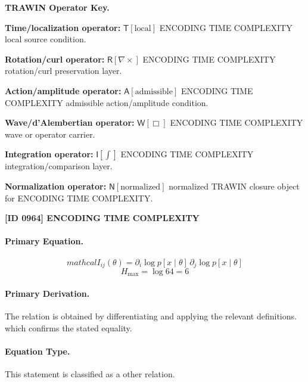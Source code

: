 \par\vspace{0.45\baselineskip}
\noindent\begin{minipage}[t]{\linewidth}
\begingroup
\small
\raggedright
\textbf{TRAWIN Operator Key.}\par
\noindent\textbf{Time/localization operator:} $\mathsf{T}\!\left[\mathrm{local}\right]$ ENCODING TIME COMPLEXITY local source condition.\par
\noindent\textbf{Rotation/curl operator:} $\mathsf{R}\!\left[\nabla\times\right]$ ENCODING TIME COMPLEXITY rotation/curl preservation layer.\par
\noindent\textbf{Action/amplitude operator:} $\mathsf{A}\!\left[\mathrm{admissible}\right]$ ENCODING TIME COMPLEXITY admissible action/amplitude condition.\par
\noindent\textbf{Wave/d'Alembertian operator:} $\mathsf{W}\!\left[\Box\right]$ ENCODING TIME COMPLEXITY wave or operator carrier.\par
\noindent\textbf{Integration operator:} $\mathsf{I}\!\left[\int\right]$ ENCODING TIME COMPLEXITY integration/comparison layer.\par
\noindent\textbf{Normalization operator:} $\mathsf{N}\!\left[\mathrm{normalized}\right]$ normalized TRAWIN closure object for ENCODING TIME COMPLEXITY.\par
\endgroup
\end{minipage}

\clearpage
\noindent\textbf{[ID 0964] ENCODING TIME COMPLEXITY}\par
\vspace{0.35em}
\paragraph{Primary Equation.}
\[
mathcal{I}_{ij}(\theta)=\partial_i \log p[x\mid\theta]\,\partial_j \log p[x\mid\theta]
\]
\[
H_{\max}=\log 64 = 6
\]

\paragraph{Primary Derivation.}
The relation is obtained by differentiating and applying the relevant definitions. which confirms the stated equality.
\paragraph{Equation Type.}
This statement is classified as a other relation.

